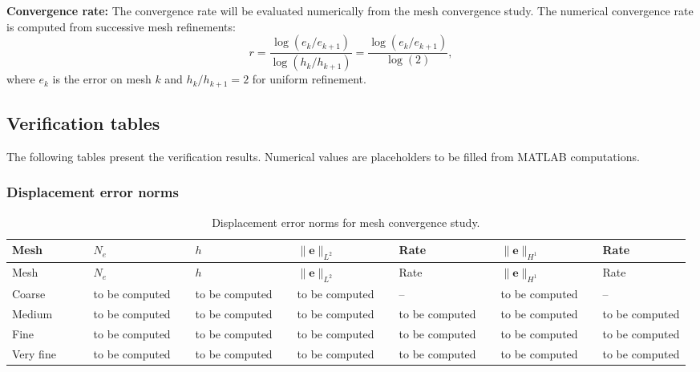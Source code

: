 \documentclass[11pt]{article}
\begin{document}
\textbf{Convergence rate:} The convergence rate will be evaluated numerically from the mesh convergence study. The numerical convergence rate is computed from successive mesh refinements:
\begin{equation}
r = \frac{\log(e_{k}/e_{k+1})}{\log(h_{k}/h_{k+1})}
= \frac{\log(e_{k}/e_{k+1})}{\log(2)},
\label{s8:numerical_rate}
\end{equation}
where $e_{k}$ is the error on mesh $k$ and $h_{k}/h_{k+1}=2$ for uniform refinement.

\subsection{Verification tables}
\label{ssec:tables}

The following tables present the verification results. Numerical values
are placeholders to be filled from MATLAB computations.

\subsubsection{Displacement error norms}

\begin{longtable}[c]{>{\raggedright\arraybackslash}p{0.12\linewidth}
>{\raggedright\arraybackslash}p{0.15\linewidth}
>{\raggedright\arraybackslash}p{0.15\linewidth}
>{\raggedright\arraybackslash}p{0.15\linewidth}
>{\raggedright\arraybackslash}p{0.15\linewidth}
>{\raggedright\arraybackslash}p{0.15\linewidth}
>{\raggedright\arraybackslash}p{0.15\linewidth}}
\caption{Displacement error norms for mesh convergence study.}
\label{tab:disp_errors}\\
\toprule
Mesh & $N_{e}$ & $h$ & $\|\mathbf{e}\|_{L^{2}}$ & Rate & $\|\mathbf{e}\|_{H^{1}}$ & Rate \\
\midrule
\endfirsthead
\toprule
Mesh & $N_{e}$ & $h$ & $\|\mathbf{e}\|_{L^{2}}$ & Rate & $\|\mathbf{e}\|_{H^{1}}$ & Rate \\
\midrule
\endhead
Coarse & to be computed & to be computed & to be computed & -- & to be computed & -- \\
Medium & to be computed & to be computed & to be computed & to be computed & to be computed & to be computed \\
Fine & to be computed & to be computed & to be computed & to be computed & to be computed & to be computed \\
Very fine & to be computed & to be computed & to be computed & to be computed & to be computed & to be computed \\
\bottomrule
\end{longtable}
\end{document}
